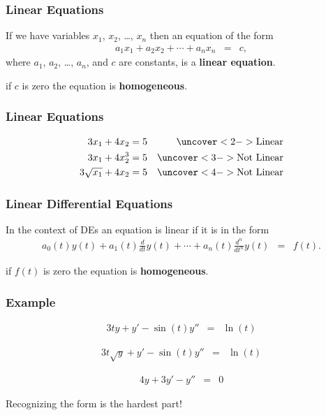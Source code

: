 \begin{frame}
  \frametitle{Linear Equations}

  If we have variables $x_1$, $x_2$, \ldots, $x_n$ then an equation of
  the form
  \begin{eqnarray*}
    a_1 x_1 + a_2 x_2 + \cdots + a_n x_n & = & c,
  \end{eqnarray*}
  where $a_1$, $a_2$, \ldots, $a_n$, and $c$ are constants, is a
  \textbf{linear equation}.

  if $c$ is zero the equation is \textbf{homogeneous}.

\end{frame}


\begin{frame}
  \frametitle{Linear Equations}

  \begin{eqnarray*}
    3 x_1 + 4 x_2 = 5 & & \uncover<2->{\mathrm{Linear}} \\
    3 x_1 + 4 x^3_2 = 5 & & \uncover<3->{\mathrm{Not~Linear}} \\
    3 \sqrt{x_1} + 4 x_2 = 5 & & \uncover<4->{\mathrm{Not~Linear}} \\
  \end{eqnarray*}


\end{frame}


\begin{frame}
  \frametitle{Linear Differential Equations}

  In the context of DEs an equation is linear if it is in the form 
  \begin{eqnarray*}
    a_0(t) y(t) + a_1(t) \frac{d}{dt}y(t) + \cdots +
    a_n(t) \frac{d^n}{dt^n}y(t) & = & f(t).
  \end{eqnarray*}

  if $f(t)$ is zero the equation is \textbf{homogeneous}.

\end{frame}


\begin{frame}
  \frametitle{Example}

  \vspace*{-3em}
  \begin{eqnarray*}
    3t y + y' - \sin(t) y'' & = & \ln(t)
  \end{eqnarray*}
  \centerline{}

  \begin{eqnarray*}
    3t \sqrt{y} + y' - \sin(t) y'' & = & \ln(t)
  \end{eqnarray*}
  \centerline{}

  \begin{eqnarray*}
    4 y + 3 y' -  y'' & = & 0
  \end{eqnarray*}
  \centerline{}

  Recognizing the form is the hardest part!

\end{frame}

